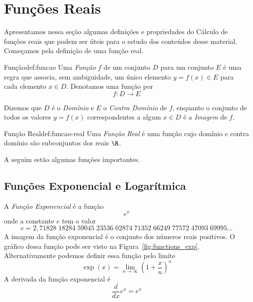 \section{Funções Reais}
\label{sec:Funcoes_Reais}

Apresentamos nessa seção algumas definições e propriedades do Cálculo de
funções reais que podem ser úteis para o estudo dos conteúdos desse material.
Começamos pela definição de uma função real.

\begin{definicao}{Função}{def:funcao}
  Uma \emph{Função} $f$ de um conjunto $D$ para um conjunto $E$
  é uma regra que associa, sem ambiguidade, um único elemento $y=f(x)\in E$
  para cada elemento $x\in D$. Denotamos uma função por
  \[
  f\colon D \to E
  \]
\end{definicao}

Dizemos que $D$ é o \emph{Domínio} e $E$ o
\emph{Contra Domínio} de $f$, enquanto o
conjunto de todos os valores $y=f(x)$ correspondentes a algum $x\in D$ é
a \emph{Imagem} de $f$.

\begin{definicao}{Função Real}{def:funcao-real}
  Uma \emph{Função Real} é uma função cujo domínio e
  contra domínio são subconjuntos dos reais $\R$.
\end{definicao}

A seguim estão algumas funções importantes.

\subsection*{Funções Exponencial e Logarítmica}

A \emph{Função Exponencial} é a função
\[
  e^x
\]
onde a constante $e$ tem o valor
\[
 e = 2,71828\;18284\;59045\;23536\;02874\;71352\;66249\;77572\;47093\;69995\dots
\]
A imagem da função exponencial é o conjunto dos números reais positivos.
O gráfico dessa função pode ser visto na Figura~\ref{fig:functions_exp}.
Alternativamente podemos definir essa função pelo limite
\begin{equation}
  \label{eq:exponencial-pelo-limite}
  \exp(x) = \lim_{n\to\infty} \left( 1 + \frac{x}{n} \right)^n
\end{equation}
A derivada da função exponencial é
\[
  \frac{d}{dx} e^x = e^x
\]

